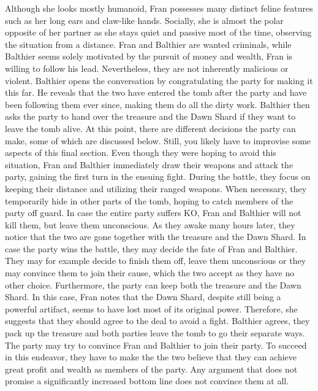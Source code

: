 Although she looks mostly humanoid, Fran possesses many distinct feline features such as her long ears and claw-like hands.
Socially, she is almost the polar opposite of her partner as she stays quiet and passive most of the time, observing the situation from a distance.
Fran and Balthier are wanted criminals, while Balthier seems solely motivated by the pursuit of money and wealth, Fran is willing to follow his lead.
Nevertheless, they are not inherently malicious or violent.
Balthier opens the conversation by congratulating the party for making it this far. 
He reveals that the two have entered the tomb after the party and have been following them ever since, making them do all the dirty work.
Balthier then asks the party to hand over the treasure and the Dawn Shard if they want to leave the tomb alive.
At this point, there are different decisions the party can make, some of which are discussed below.
Still, you likely have to improvise some aspects of this final section.
%
\vfill
%
Even though they were hoping to avoid this situation, Fran and Balthier immediately draw their weapons and attack the party, gaining the first turn in the ensuing fight.
During the battle, they focus on keeping their distance and utilizing their ranged weapons.
When necessary, they temporarily hide in other parts of the tomb, hoping to catch members of the party off guard.
In case the entire party suffers KO, Fran and Balthier will not kill them, but leave them unconscious. 
As they awake many hours later, they notice that the two are gone together with the treasure and the Dawn Shard.
In case the party wins the battle, they may decide the fate of Fran and Balthier.
They may for example decide to finish them off, leave them unconscious or they may convince them to join their cause, which the two accept as they have no other choice.
Furthermore, the party can keep both the treasure and the Dawn Shard.
%
\vfill
%
In this case, Fran notes that the Dawn Shard, despite still being a powerful artifact, seems to have lost most of its original power.
Therefore, she suggests that they should agree to the deal to avoid a fight.
Balthier agrees, they pack up the treasure and both parties leave the tomb to go their separate ways.
%
\newpage
%
The party may try to convince Fran and Balthier to join their party.
To succeed in this endeavor, they have to make the the two believe that they can achieve great profit and wealth as members of the party.
Any argument that does not promise a significantly increased bottom line does not convince them at all.
